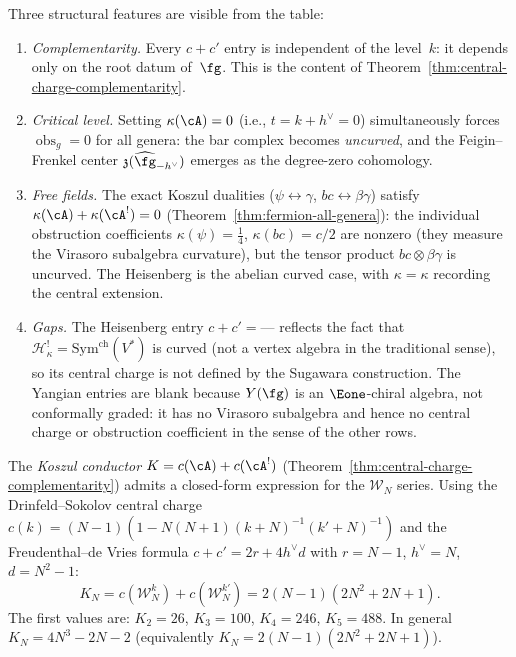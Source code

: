 \begin{remark}\label{rem:reading-master-table}
Three structural features are visible from the table:
\begin{enumerate}
\item \emph{Complementarity.}
  Every $c + c'$ entry is independent of the level~$k$: it depends
  only on the root datum of~$\fg$.
  This is the content of Theorem~\ref{thm:central-charge-complementarity}.
\item \emph{Critical level.}
  Setting $\kappa(\cA) = 0$ (i.e., $t = k + h^\vee = 0$)
  simultaneously forces $\operatorname{obs}_g = 0$
  for all genera: the bar complex becomes \emph{uncurved}, and
  the Feigin--Frenkel center $\mathfrak{z}(\widehat{\fg}_{-h^\vee})$
  emerges as the degree-zero cohomology.
\item \emph{Free fields.}
  The exact Koszul dualities ($\psi \leftrightarrow \gamma$,
  $bc \leftrightarrow \beta\gamma$) satisfy
  $\kappa(\cA) + \kappa(\cA^!) = 0$
  (Theorem~\ref{thm:fermion-all-genera}): the individual
  obstruction coefficients $\kappa(\psi) = \tfrac{1}{4}$,
  $\kappa(bc) = c/2$ are nonzero (they measure the
  Virasoro subalgebra curvature), but the tensor product
  $bc \otimes \beta\gamma$ is uncurved.
  The Heisenberg is the abelian curved case, with
  $\kappa = \kappa$ recording the central extension.
\item \emph{Gaps.}
  The Heisenberg entry $c + c' = \text{---}$ reflects the fact that
  $\mathcal{H}_\kappa^! = \mathrm{Sym}^{\mathrm{ch}}(V^*)$ is
  curved (not a vertex algebra in the traditional sense), so
  its central charge is not defined by the Sugawara construction.
  The Yangian entries are blank because $Y(\fg)$ is an $\Eone$-chiral
  algebra, not conformally graded: it has no Virasoro subalgebra
  and hence no central charge or obstruction coefficient in the
  sense of the other rows.
\end{enumerate}
\end{remark}

\begin{remark}\label{rem:koszul-conductor-explicit}
The \emph{Koszul conductor} $K = c(\cA) + c(\cA^!)$ (Theorem~\ref{thm:central-charge-complementarity}) admits a closed-form expression for the $\mathcal{W}_N$ series.  Using the Drinfeld--Sokolov central charge $c(k) = (N-1)(1 - N(N+1)(k+N)^{-1}(k'+N)^{-1})$ and the Freudenthal--de Vries formula $c + c' = 2r + 4h^\vee d$ with $r = N-1$, $h^\vee = N$, $d = N^2-1$:
\[
K_N = c(\mathcal{W}_N^k) + c(\mathcal{W}_N^{k'}) = 2(N-1)(2N^2 + 2N + 1).
\]
The first values are: $K_2 = 26$, $K_3 = 100$, $K_4 = 246$, $K_5 = 488$.  In general $K_N = 4N^3 - 2N - 2$ (equivalently $K_N = 2(N-1)(2N^2+2N+1)$).
\end{remark}

